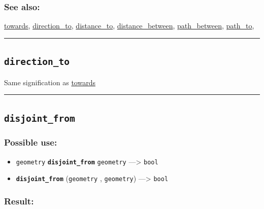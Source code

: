\documentclass[]{book}
\providecommand{\tightlist}{%
  \setlength{\itemsep}{0pt}\setlength{\parskip}{0pt}}
\theoremstyle{definition}
\theoremstyle{definition}
\theoremstyle{definition}
\theoremstyle{remark}
\begin{document}
\subsubsection{See also:}\label{see-also-78}

\href{operators-s-to-z.html\#towards}{towards},
\href{operators-d-to-h.html\#direction_to}{direction\_to},
\href{operators-d-to-h.html\#distance_to}{distance\_to},
\href{operators-d-to-h.html\#distance_between}{distance\_between},
\href{operators-n-to-r.html\#path_between}{path\_between},
\href{operators-n-to-r.html\#path_to}{path\_to},

\begin{center}\rule{0.5\linewidth}{\linethickness}\end{center}

\subsection{\texorpdfstring{\texttt{direction\_to}}{direction\_to}}\label{direction_to}

Same signification as \href{operators-s-to-z.html\#towards}{towards}

\begin{center}\rule{0.5\linewidth}{\linethickness}\end{center}

\subsection{\texorpdfstring{\texttt{disjoint\_from}}{disjoint\_from}}\label{disjoint_from}

\subsubsection{Possible use:}\label{possible-use-134}

\begin{itemize}
\tightlist
\item
  \texttt{geometry} \textbf{\texttt{disjoint\_from}} \texttt{geometry}
  ---\textgreater{} \texttt{bool}
\item
  \textbf{\texttt{disjoint\_from}} (\texttt{geometry} ,
  \texttt{geometry}) ---\textgreater{} \texttt{bool}
\end{itemize}

\subsubsection{Result:}\label{result-130}
\end{document}
